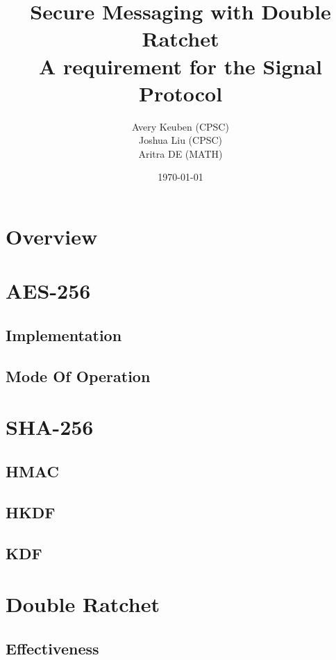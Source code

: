 \documentclass{article}
\title{Secure Messaging with Double Ratchet\\ A requirement for the Signal Protocol}
\author{Avery Keuben (CPSC)\\ Joshua Liu (CPSC)\\ Aritra DE (MATH)}
\date{\today}
\theoremstyle{plain}
\begin{document}
\maketitle

\newpage

\section{Overview}


\section{AES-256}


\subsection{Implementation}


\subsection{Mode Of Operation}


\section{SHA-256}

\subsection{HMAC}

\subsection{HKDF}

\subsection{KDF}


\section{Double Ratchet}


\subsection{Effectiveness}

\end{document}
